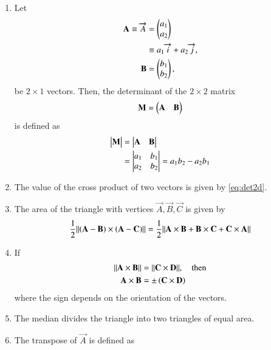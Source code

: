 \begin{enumerate}[label=\thesection.\arabic*.,ref=\thesection.\theenumi]
\item Let 
\begin{align}
  \mathbf{A} \equiv \overrightarrow{A} &= \begin{pmatrix}a_1\\a_2\end{pmatrix} 
  \\
  &\equiv a_1\overrightarrow{i}+a_2\overrightarrow{j}, 
  \\
  \mathbf{B} &= \begin{pmatrix}b_1\\b_2\end{pmatrix}, 
\end{align}
be $2 \times 1$ vectors.
Then, the determinant of the $2 \times 2$ matrix 
\begin{align}  
  \mathbf{M} = \begin{pmatrix}\mathbf{A} & \mathbf{B}\end{pmatrix}
\end{align}
is defined as
\begin{align}
  \label{eq:det2d}
  \begin{vmatrix}\mathbf{M}\end{vmatrix} &= \begin{vmatrix}\mathbf{A} & \mathbf{B}\end{vmatrix} 
  \\
  &= \begin{vmatrix}a_1 & b_1\\a_2 & b_2\end{vmatrix} = a_1b_2 - a_2 b_1
\end{align}
%
\item The value of the cross product of two vectors is given by  
  \eqref{eq:det2d}.
\item The area of the triangle with vertices $\vec{A}, \vec{B}, \vec{C}$ is given by 
	\label{prop:area2d}
\begin{align}
  \label{eq:area2d}
	\frac{1}{2}\lVert\left(\mathbf{A}-\mathbf{B}\right) \times \left(\mathbf{A}-\mathbf{C}\right)\rVert
 = 
 \frac{1}{2}\lVert\mathbf{A} \times \mathbf{B}+\mathbf{B} \times \mathbf{C}+\mathbf{C} \times \mathbf{A}\rVert
  \end{align}
  \item If 
  \label{prop:area2d-norm}
\begin{align}
  \label{eq:area2d-norm}
	\lVert\mathbf{A}\times\mathbf{B}\rVert  &= \lVert\mathbf{C}\times \mathbf{D}\rVert, \quad \text{then}
	\\
	\mathbf{A}\times\mathbf{B}  &= \pm\left(\mathbf{C}\times \mathbf{D}\right)
  \end{align}
  where the sign depends on the orientation of the vectors.
  \item The median divides the triangle into two triangles of equal area.
	  \label{prop:two-median-area}
  \item  The transpose of $\vec{A}$ is defined as

\end{enumerate}
